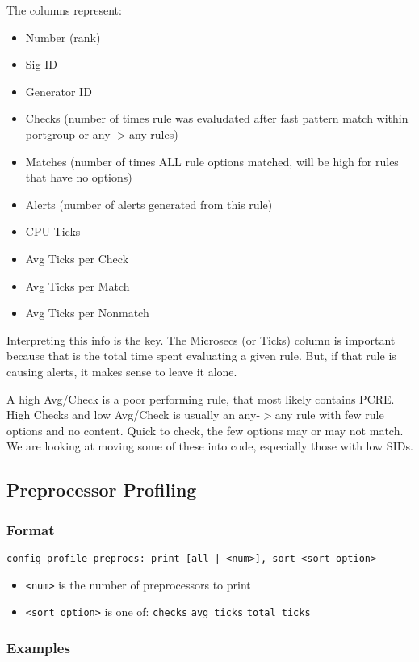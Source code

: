 \documentclass[english]{report}
\begin{document}
The columns represent:
\begin{itemize}
\item Number (rank)
\item Sig ID
\item Generator ID
\item Checks (number of times rule was evaludated after fast pattern match
  within portgroup or any-$>$any rules)
\item Matches (number of times ALL rule options matched, will be high for
  rules that have no options)
\item Alerts (number of alerts generated from this rule)
\item CPU Ticks 
\item Avg Ticks per Check
\item Avg Ticks per Match
\item Avg Ticks per Nonmatch
\end{itemize}

Interpreting this info is the key.  The Microsecs (or Ticks) column is important
because that is the total time spent evaluating a given rule.  But,
if that rule is causing alerts, it makes sense to leave it alone.

A high Avg/Check is a poor performing rule, that most likely contains PCRE.
High Checks and low Avg/Check is usually an any-$>$any rule with few rule
options and no content.  Quick to check, the few options may or may not
match.  We are looking at moving some of these into code, especially
those with low SIDs.

\subsection{Preprocessor Profiling\label{preproc profiling}}

\subsubsection{Format}
\texttt{config profile\_preprocs: print [all | <num>], sort <sort\_option>}

\begin{itemize}
\item \texttt{<num>} is the number of preprocessors to print
\item \texttt{<sort\_option>} is one of:
\subitem \texttt{checks}
\subitem \texttt{avg\_ticks}
\subitem \texttt{total\_ticks}
\end{itemize}

\subsubsection{Examples}
\end{document}
